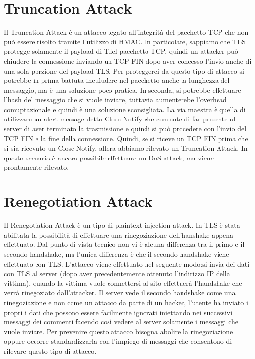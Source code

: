 \documentclass[a4paper,draft]{article}
\begin{document}
\section{Truncation Attack}
Il Truncation Attack è un attacco legato all'integrità del pacchetto TCP che non può essere risolto tramite l'utilizzo di HMAC\@. In particolare, sappiamo che TLS protegge solamente il payload di Tdel pacchetto TCP, quindi un attacker può chiudere la connessione inviando un TCP FIN dopo aver concesso l'invio anche di una sola porzione del payload TLS\@.\newline
Per proteggerci da questo tipo di attacco si potrebbe in prima battuta inculudere nel pacchetto anche la lunghezza del messaggio, ma è una soluzione poco pratica\@. In seconda, si potrebbe effettuare l'hash del messaggio che si vuole inviare, tuttavia aumenterebe l'overhead comuptazionale e quindi è una soluzione sconsigliata\@. La via maestra è quella di utilizzare un alert message detto Close-Notify che consente di far presente al server di aver terminato la trasmissione e quindi si può procedere con l'invio del TCP FIN e la fine della connessione\@. Quindi, se si riceve un TCP FIN prima che si sia ricevuto un Close-Notify, allora abbiamo rilevato un Truncation Attack\@. In questo scenario è ancora possibile effettuare un DoS attack, ma viene prontamente rilevato\@.
\section{Renegotiation Attack}
Il Renegotiation Attack è un tipo di plaintext injection attack\@. In TLS è stata abilitata la possibilità di effettuare una rinegoziazione dell'hanshake appena effettuato\@. Dal punto di vista tecnico non vi è alcuna differenza tra il primo e il secondo handshake, ma l'unica differenza è che il secondo handshake viene effettuato con TLS\@.\newline
L'attacco viene effettuato nel seguente modo:\@inizialmente si invia dei dati con TLS al server (dopo aver precedentemente ottenuto l'indirizzo IP della vittima), quando la vittima vuole connettersi al sito effettuerà l'handshake che verrà rinegoziato dall'attacker\@. Il server vede il secondo handshake come una rinegoziazione e non come un attacco da parte di un hacker, l'utente ha inviato i propri i dati che possono essere facilmente ignorati iniettando nei successivi messaggi dei commenti facendo così vedere al server solamente i messaggi che vuole inviare\@.\newline
Per prevenire questo attacco bisogna abolire la rinegoziazione oppure occorre standardizzarla con l'impiego di messaggi che consentono di rilevare questo tipo di attacco\@.
\end{document}
